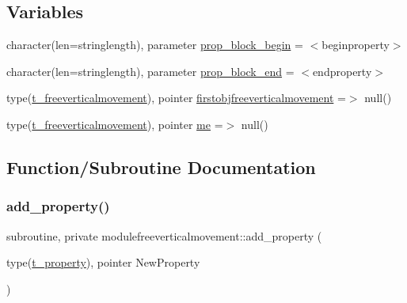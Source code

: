 \subsection*{Variables}
\begin{DoxyCompactItemize}
\item 
character(len=stringlength), parameter \mbox{\hyperlink{namespacemodulefreeverticalmovement_a1ece5e8dc845d51331f4b843dcc6c478}{prop\+\_\+block\+\_\+begin}} = \textquotesingle{}$<$beginproperty$>$\textquotesingle{}
\item 
character(len=stringlength), parameter \mbox{\hyperlink{namespacemodulefreeverticalmovement_aa4fffdbed67b4800eea74f1389195f60}{prop\+\_\+block\+\_\+end}} = \textquotesingle{}$<$endproperty$>$\textquotesingle{}
\item 
type(\mbox{\hyperlink{structmodulefreeverticalmovement_1_1t__freeverticalmovement}{t\+\_\+freeverticalmovement}}), pointer \mbox{\hyperlink{namespacemodulefreeverticalmovement_af05afdb031d50e81aaa92c9b99793254}{firstobjfreeverticalmovement}} =$>$ null()
\item 
type(\mbox{\hyperlink{structmodulefreeverticalmovement_1_1t__freeverticalmovement}{t\+\_\+freeverticalmovement}}), pointer \mbox{\hyperlink{namespacemodulefreeverticalmovement_a28b010cc15d0e2ac1ad1a9ddf71afb4d}{me}} =$>$ null()
\end{DoxyCompactItemize}


\subsection{Function/\+Subroutine Documentation}
\mbox{\label{namespacemodulefreeverticalmovement_a9138567f31f0c9e91b69d5268c3855ce}} 
\subsubsection{\texorpdfstring{add\+\_\+property()}{add\_property()}}
{\footnotesize\ttfamily subroutine, private modulefreeverticalmovement\+::add\+\_\+property (\begin{DoxyParamCaption}\item[{type(\mbox{\hyperlink{structmodulefreeverticalmovement_1_1t__property}{t\+\_\+property}}), pointer}]{New\+Property }\end{DoxyParamCaption})\hspace{0.3cm}{\ttfamily [private]}}

